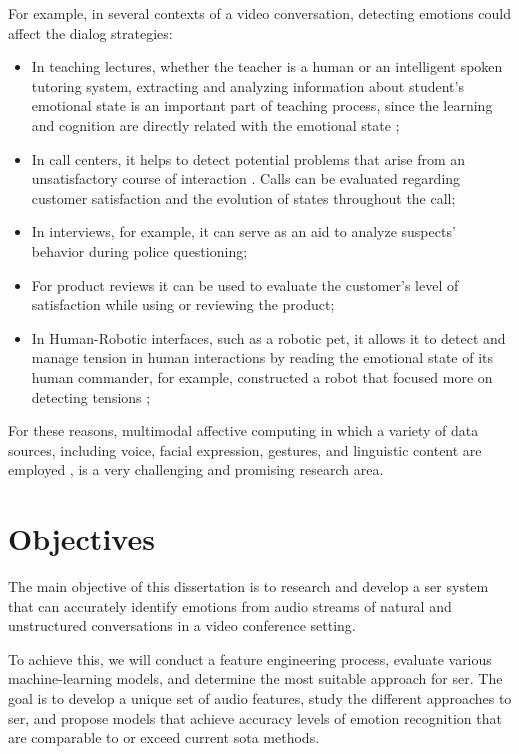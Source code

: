 For example, in several contexts of a video conversation, detecting emotions could affect the dialog strategies:
\begin{itemize}
	\item In teaching lectures, whether the teacher is a human or an intelligent spoken tutoring system, extracting and analyzing information about student's emotional state is an important part of teaching process, since the learning and cognition are directly related with the emotional state \cite{teachexample};
	\item In call centers, it helps to detect potential problems that arise from an unsatisfactory course of interaction \cite{ccexample1, ccexample2, ccexample3}. Calls can be evaluated regarding customer satisfaction and the evolution of states throughout the call;
	\item In interviews, for example, it can serve as an aid to analyze suspects' behavior during police questioning;
	\item For product reviews it can be used to evaluate the customer's level of satisfaction while using or reviewing the product;
	\item In Human-Robotic interfaces, such as a robotic pet, it allows it to detect and manage tension in human interactions by reading the emotional state of its human commander, for example, \citeauthor{Kanda2005} constructed a robot that focused more on detecting tensions \cite{Kanda2005};
\end{itemize}

For these reasons, multimodal affective computing in which a variety of data sources, including voice, facial expression, gestures, and linguistic content are employed \cite{BALAZS201695}, is a very challenging and promising research area.


\section{Objectives}

The main objective of this dissertation is to research and develop a \ac{ser} system that can accurately identify emotions from audio streams of natural and unstructured conversations in a video conference setting.

To achieve this, we will conduct a feature engineering process, evaluate various machine-learning models, and determine the most suitable approach for \ac{ser}. The goal is to develop a unique set of audio features, study the different approaches to \ac{ser}, and propose models that achieve accuracy levels of emotion recognition that are comparable to or exceed current \ac{sota} methods.

